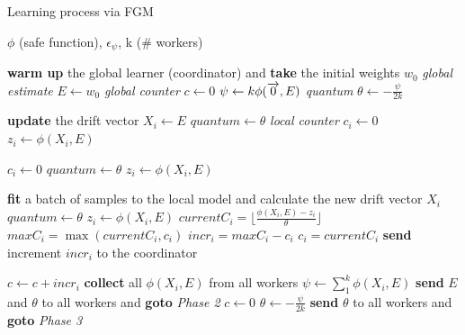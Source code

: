 \begin{algorithm}[h!]
    \caption{Learning process via FGM}
    \begin{algorithmic}[1]

        \vspace{0.05in}
        \REQUIRE $\phi$ (safe function), $\epsilon_\psi$, k (\# workers)
        \vspace{0.05in}

        \vspace{-2.5ex}
        \STATE \textbf{warm up} the global learner (coordinator) and \textbf{take} the initial weights $w_0$
        \STATE \emph{global estimate} $E \leftarrow w_0$
        \STATE \emph{global counter} $c \leftarrow 0$
        \STATE $\psi \leftarrow k \phi(\overrightarrow{\rm 0}, E)$
        \STATE \emph{quantum} $\theta \leftarrow -\frac{\psi}{2k}$

        \vspace{-2.5ex}
        \STATE \textbf{update} the drift vector $X_i \leftarrow E$
        \STATE $quantum \leftarrow \theta$
        \STATE \emph{local counter} $c_i \leftarrow 0$
        \STATE $z_i \leftarrow \phi(X_i, E)$

        \vspace{-2.5ex}
        \STATE $c_i \leftarrow 0$
        \STATE $quantum \leftarrow \theta$
        \STATE $z_i \leftarrow \phi(X_i, E)$

        \vspace{-2.5ex}
        \STATE \textbf{fit} a batch of samples to the local model and calculate the new drift vector $X_i$
        \STATE $quantum \leftarrow \theta$
        \STATE $z_i \leftarrow \phi(X_i, E)$
        \STATE $currentC_i = \lfloor \frac{\phi(X_i,E) - z_i}{\theta} \rfloor$
        \STATE $maxC_i = \max(currentC_i, c_i)$
        \STATE $incr_i = maxC_i - c_i$
        \STATE $c_i = currentC_i$
        \STATE \textbf{send} increment $incr_i$ to the coordinator
        \ENDIF

        \vspace{-2.5ex}
        \STATE $c \leftarrow c + incr_i$
        \STATE \textbf{collect} all $\phi(X_i,E)$ from all workers
        \STATE $\psi \leftarrow \sum_{1}^{k} \phi(X_i, E)$
        \STATE \textbf{send} $E$ and $\theta$ to all workers and \textbf{goto} \emph{Phase 2} 
        \ELSE
        \STATE $c \leftarrow 0$
        \STATE $\theta \leftarrow -\frac{\psi}{2k}$
        \STATE \textbf{send} $\theta$ to all workers and \textbf{goto} \emph{Phase 3} 
        \ENDIF
        \ENDIF

    \end{algorithmic}\label{alg:rnn_fgm}
\end{algorithm}
